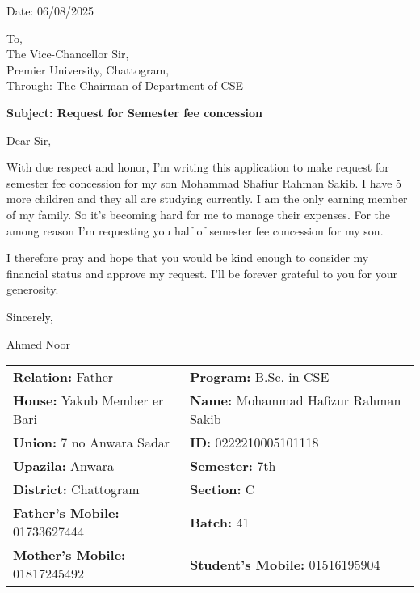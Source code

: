 \documentclass[12pt]{article}
\begin{document}
\begin{flushright}
    \vspace*{0.5cm}
    Date: 06/08/2025
\end{flushright}

\vspace{0.5cm}
\begin{flushleft}
To,\\
The Vice-Chancellor Sir,\\
Premier University, Chattogram,\\
Through: The Chairman of Department of CSE
\end{flushleft}

\vspace{0.3cm}
\begin{flushleft}
\textbf{Subject: Request for Semester fee concession}
\end{flushleft}

\vspace{0.3cm}
\begin{flushleft}
Dear Sir,
\end{flushleft}

\justifying
With due respect and honor, I'm writing this application to make request for semester fee concession for my son Mohammad Shafiur Rahman Sakib. I have 5 more children and they all are studying currently. I am the only earning member of my family. So it's becoming hard for me to manage their expenses. For the among reason I'm requesting you half of semester fee concession for my son.

I therefore pray and hope that you would be kind enough to consider my financial status and approve my request. I'll be forever grateful to you for your generosity.

\vspace{0.5cm}
Sincerely,\\
\vspace{0.5cm}
\begin{flushleft}
Ahmed Noor
\end{flushleft}

\vspace{0.5cm}
\begin{tabular}{@{}L{3.5in}L{3.5in}@{}}
    \textbf{Relation:} Father & \textbf{Program:} B.Sc. in CSE \\
    \textbf{House:} Yakub Member er Bari & \textbf{Name:} Mohammad Hafizur Rahman Sakib \\
    \textbf{Union:} 7 no Anwara Sadar & \textbf{ID:} 0222210005101118 \\
    \textbf{Upazila:} Anwara & \textbf{Semester:} 7th \\
    \textbf{District:} Chattogram & \textbf{Section:} C \\
    \textbf{Father's Mobile:} 01733627444 & \textbf{Batch:} 41 \\
    \textbf{Mother's Mobile:} 01817245492 & \textbf{Student's Mobile:} 01516195904 \\
\end{tabular}
\end{document}
